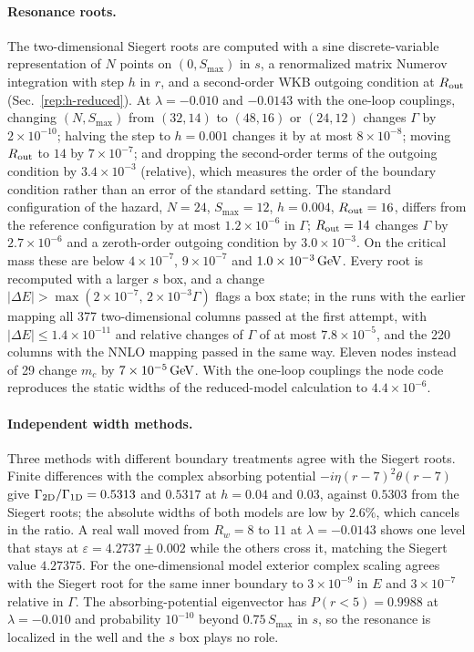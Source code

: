 \paragraph{Resonance roots.}
The two-dimensional Siegert roots are computed with a sine discrete-variable representation of $N$ points on $(0,S_{\max})$ in $s$, a renormalized matrix Numerov integration with step $h$ in $r$, and a second-order WKB outgoing condition at $R_{\rm out}$ (Sec.~\ref{rep:h-reduced}).
At $\lambda=-0.010$ and $-0.0143$ with the one-loop couplings, changing $(N,S_{\max})$ from $(32,14)$ to $(48,16)$ or $(24,12)$ changes $\Gamma$ by $2\times10^{-10}$; halving the step to $h=0.001$ changes it by at most $8\times10^{-8}$; moving $R_{\rm out}$ to $14$ by $7\times10^{-7}$; and dropping the second-order terms of the outgoing condition by $3.4\times10^{-3}$ (relative), which measures the order of the boundary condition rather than an error of the standard setting. %
The standard configuration of the hazard, $N=24$, $S_{\max}=12$, $h=0.004$, $R_{\rm out}=16$, differs from the reference configuration by at most $1.2\times10^{-6}$ in $\Gamma$; $R_{\rm out}=14$ changes $\Gamma$ by $2.7\times10^{-6}$ and a zeroth-order outgoing condition by $3.0\times10^{-3}$. %
On the critical mass these are below $4\times10^{-7}$, $9\times10^{-7}$ and $1.0\times10^{-3}\,\mathrm{GeV}$. %
Every root is recomputed with a larger $s$ box, and a change $|\Delta E|>\max(2\times10^{-7},\,2\times10^{-3}\Gamma)$ flags a box state; in the runs with the earlier mapping all 377 two-dimensional columns passed at the first attempt, with $|\Delta E|\le1.4\times10^{-11}$ and relative changes of $\Gamma$ of at most $7.8\times10^{-5}$, and the 220 columns with the NNLO mapping passed in the same way. %
Eleven nodes instead of 29 change $m_c$ by $7\times10^{-5}\,\mathrm{GeV}$. %
With the one-loop couplings the node code reproduces the static widths of the reduced-model calculation to $4.4\times10^{-6}$. %

\paragraph{Independent width methods.}
Three methods with different boundary treatments agree with the Siegert roots.
Finite differences with the complex absorbing potential $-i\eta(r-7)^2\theta(r-7)$ give $\Gamma_{\rm 2D}/\Gamma_{\rm 1D}=0.5313$ and $0.5317$ at $h=0.04$ and $0.03$, against $0.5303$ from the Siegert roots; the absolute widths of both models are low by $2.6\%$, which cancels in the ratio. %
A real wall moved from $R_w=8$ to $11$ at $\lambda=-0.0143$ shows one level that stays at $\varepsilon=4.2737\pm0.002$ while the others cross it, matching the Siegert value $4.27375$. %
For the one-dimensional model exterior complex scaling agrees with the Siegert root for the same inner boundary to $3\times10^{-9}$ in $E$ and $3\times10^{-7}$ relative in $\Gamma$. %
The absorbing-potential eigenvector has $P(r<5)=0.9988$ at $\lambda=-0.010$ and probability $10^{-10}$ beyond $0.75\,S_{\max}$ in $s$, so the resonance is localized in the well and the $s$ box plays no role. %

